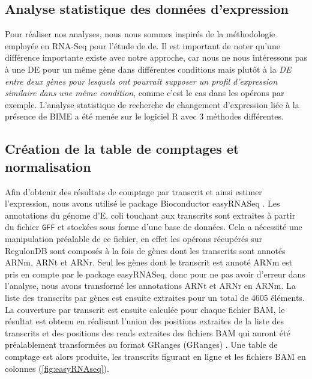 \documentclass[12pt,a4paper]{report}
\begin{document}
\begin{onehalfspace}
\section*{Analyse statistique des données d'expression}
Pour réaliser nos analyses, nous nous sommes inspirés de la méthodologie employée en RNA-Seq pour l'étude de \gls{de}. Il est important de noter qu'une différence importante existe avec notre approche, car nous ne nous intéressons pas à une DE pour un m\^eme gène dans différentes conditions mais plutôt à la \emph{DE entre deux gènes pour lesquels ont pourrait supposer un profil d'expression similaire dans une même condition}, comme c'est le cas dans les opérons par exemple. L'analyse statistique de recherche de changement d'expression liée à la présence de BIME a été menée sur le logiciel R avec 3 méthodes différentes.

\subsection*{Création de la table de comptages et normalisation}
Afin d'obtenir des résultats de comptage par transcrit et ainsi estimer l'expression, nous avons utilisé le package Bioconductor easyRNASeq \citep{Delhomme2012}. Les annotations du génome d'E. coli touchant aux transcrits sont extraites à partir du fichier \texttt{GFF} et stockées sous forme d'une base de données. Cela a nécessité une manipulation préalable de ce fichier, en effet les opérons récupérés sur RegulonDB sont composés à la fois de gènes dont les transcrits sont annotés ARNm, ARNt et ARNr. Seul les gènes dont le transcrit est annoté ARNm est pris en compte par le package easyRNASeq, donc pour ne pas avoir d'erreur dans l'analyse, nous avons transformé les annotations ARNt et ARNr en ARNm.
La liste des transcrits par gènes est ensuite extraites pour un total de 4605 éléments. La couverture par transcrit est ensuite calculée pour chaque fichier BAM, le résultat est obtenu en réalisant l'union des positions extraites de la liste des transcrits et des positions des reads extraites des fichiers BAM qui auront été préalablement transformées au format \gls{GRanges} (GRanges)  \citep{Lawrence2013}. Une table de comptage est alors produite, les transcrits figurant en ligne et les fichiers BAM en colonnes (\autoref{fig:easyRNAseq}).


\end{onehalfspace}
\end{document}
